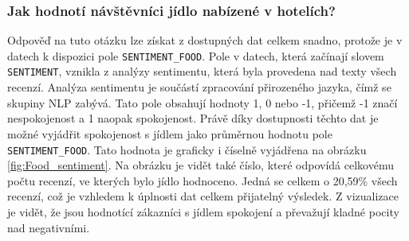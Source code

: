 \documentclass[czech,BP]{thesiskiv}
\begin{document}
\subsubsection{Jak hodnotí návštěvníci jídlo nabízené v hotelích?}
\label{subsub:Jídlo}
Odpověď na tuto otázku lze získat z dostupných dat celkem snadno, protože je v datech k dispozici pole \texttt{SENTIMENT\_FOOD}. Pole v datech, která začínají slovem \texttt{SENTIMENT}, vznikla z analýzy sentimentu, která byla provedena nad texty všech recenzí. Analýza sentimentu je součástí zpracování přirozeného jazyka, čímž se skupiny NLP zabývá. Tato pole obsahují hodnoty 1, 0 nebo -1, přičemž -1 značí nespokojenost a 1 naopak spokojenost. Právě díky dostupnosti těchto dat je možné vyjádřit spokojenost s jídlem jako průměrnou hodnotu pole \texttt{SENTIMENT\_FOOD}. Tato hodnota je graficky i číselně vyjádřena na obrázku \ref{fig:Food_sentiment}. Na obrázku je vidět také číslo, které odpovídá celkovému počtu recenzí, ve kterých bylo jídlo hodnoceno. Jedná se celkem o 20,59\% všech recenzí, což je vzhledem k úplnosti dat celkem přijatelný výsledek. Z vizualizace je vidět, že jsou hodnotící zákazníci s jídlem spokojení a převažují kladné pocity nad negativními.
\end{document}
